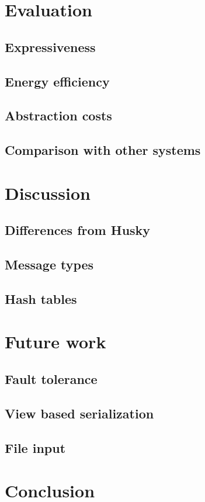 \documentclass{uit-report}
\begin{document}
\newpage
\chapter{Evaluation}
\section{Expressiveness}
\section{Energy efficiency}
\section{Abstraction costs}
\section{Comparison with other systems}

\newpage
\chapter{Discussion}
\section{Differences from Husky}
\section{Message types}
\section{Hash tables}



\newpage
\chapter{Future work}
\section{Fault tolerance}
\section{View based serialization}
\section{File input}

\newpage
\chapter{Conclusion}




\pagebreak



\end{document}
